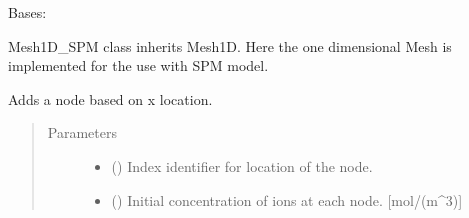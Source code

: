 \documentclass[letterpaper,10pt,english]{sphinxmanual}
\begin{document}
\begin{fulllineitems}
\label{\detokenize{mesh:mesh.Mesh1D_SPM}}
\sphinxAtStartPar
Bases: {\hyperref[\detokenize{mesh:mesh.Mesh1D}]{}}

\sphinxAtStartPar
Mesh1D\_SPM class inherits Mesh1D. Here the one dimensional Mesh
is implemented for the use with SPM model.

\begin{fulllineitems}
\label{\detokenize{mesh:mesh.Mesh1D_SPM.add_node}}
\sphinxAtStartPar
Adds a node based on x location.
\begin{quote}\begin{description}
\item[{Parameters}] \leavevmode\begin{itemize}
\item {} 
\sphinxAtStartPar
{} (\sphinxstyleliteralemphasis{\sphinxupquote{{[}}}\sphinxstyleliteralemphasis{\sphinxupquote{{]}}}) \textendash{} Index identifier for location of the node.

\item {} 
\sphinxAtStartPar
{} (\sphinxstyleliteralemphasis{\sphinxupquote{{[}}}\sphinxstyleliteralemphasis{\sphinxupquote{{]}}}) \textendash{} Initial concentration of ions at each node. {[}mol/(m\textasciicircum{}3){]}

\end{itemize}

\end{description}\end{quote}

\end{fulllineitems}



\end{fulllineitems}
\end{document}
